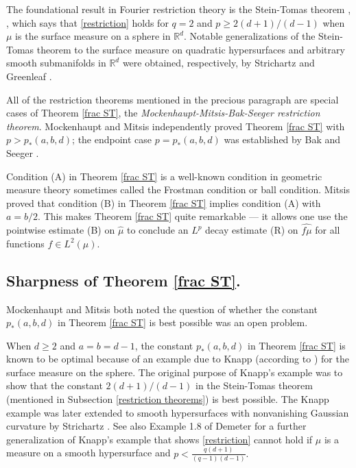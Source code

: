 \documentclass{amsart}
\numberwithin{equation}{section}
\theoremstyle{definition}
\theoremstyle{definition}
\def\RR{\mathbb{R}}
\begin{document}
The foundational result in Fourier restriction theory is the Stein-Tomas theorem \cite{tomas-1975}, \cite{tomas-symp},  which says that \eqref{restriction} holds for $q=2$ and $p \geq 2(d+1)/(d-1)$ when $\mu$ is the surface measure on a sphere in $\RR^d$. Notable generalizations of the Stein-Tomas theorem to the surface measure on quadratic hypersurfaces and arbitrary smooth submanifolds in $\RR^d$ were obtained, respectively, by Strichartz \cite{Strichartz77} and Greenleaf \cite{Greenleaf}. 

All of the restriction theorems mentioned in the precious paragraph are special cases of 
Theorem \ref{frac ST}, the \textit{Mockenhaupt-Mitsis-Bak-Seeger restriction theorem}. 
Mockenhaupt \cite{mock} and Mitsis \cite{mitsis-res} independently proved Theorem \ref{frac ST} with $p > p_{*}(a,b,d)$;  
the endpoint case $p = p_{*}(a,b,d)$ was established by Bak and Seeger \cite{bak-seeger}. 



Condition (A) in Theorem \ref{frac ST} is a well-known condition in geometric measure theory sometimes called the Frostman condition or ball condition. 
Mitsis \cite{mitsis-res} proved that condition (B) in Theorem \ref{frac ST} implies condition (A) with $a=b/2$. 
This makes Theorem \ref{frac ST} quite remarkable ---  it allows one use the  pointwise estimate (B) on $\widehat{\mu}$ to conclude an $L^p$ decay estimate (R) on $\widehat{f\mu}$ for all functions $f \in L^2(\mu)$. 



 

\subsection{Sharpness of Theorem \ref{frac ST}.}


Mockenhaupt\cite{mock} and Mitsis \cite{mitsis-res} 
both noted the question of whether the constant $p_*(a,b,d)$ in Theorem \ref{frac ST} is best possible was an open problem. 









When $d \geq 2$ and $a=b=d-1$, the constant $p_{*}(a,b,d)$ in Theorem \ref{frac ST} is known to be optimal because of an example due to Knapp (according to  \cite{tomas-symp}) for the surface measure on the sphere. 
The original purpose of Knapp's example was to show that the constant $2(d+1)/(d-1)$ in the Stein-Tomas theorem (mentioned in Subsection \ref{restriction theorems}) is best possible. 
The Knapp example was later extended 
 to smooth hypersurfaces with nonvanishing Gaussian curvature  by Strichartz \cite{Strichartz77}. See also Example 1.8 of Demeter \cite{Demeter} for a further generalization of Knapp's example  that shows \eqref{restriction} cannot hold if $\mu$ is a measure on a smooth hypersurface and $p < \frac{q(d + 1)}{(q - 1) (d - 1)}.$ 
\end{document}
